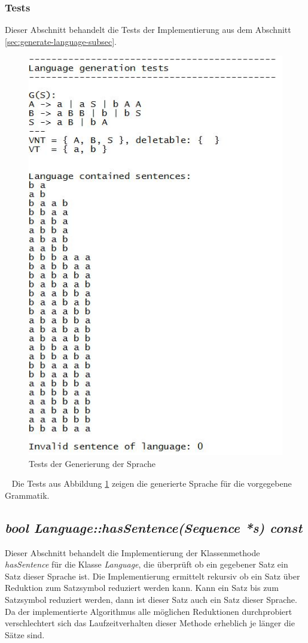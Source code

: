 \documentclass[11pt, a4paper, twoside]{article}   	%
\begin{document}
\subsubsection{Tests}
Dieser Abschnitt behandelt die Tests der Implementierung aus dem Abschnitt \ref{sec:generate-language-subsec}.
\begin{figure}[h]
\centering
\includegraphics[scale=0.75]{tests_generate_language_1.JPG}
\caption{Tests der Generierung der Sprache}
\label{fig:generate-tests-language}
\end{figure}
\ \newline
Die Tests aus Abbildung \ref{fig:generate-tests-language} zeigen die generierte Sprache für die vorgegebene Grammatik. 
\newpage

\subsection{\emph{bool Language::hasSentence(Sequence *s) const}}
Dieser Abschnitt behandelt die Implementierung der Klassenmethode \emph{hasSentence} für die Klasse \emph{Language}, die überprüft ob ein gegebener Satz ein Satz dieser Sprache ist. Die Implementierung ermittelt rekursiv ob ein Satz über Reduktion zum Satzsymbol reduziert werden kann. Kann ein Satz bis zum Satzsymbol reduziert werden, dann ist dieser Satz auch ein Satz dieser Sprache. Da der implementierte Algorithmus alle möglichen Reduktionen durchprobiert verschlechtert sich das Laufzeitverhalten dieser Methode erheblich je länger die Sätze sind.
\end{document}
